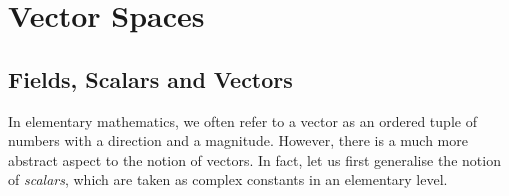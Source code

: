 \documentclass[math, code]{amznotes}
\theoremstyle{remark}
\begin{document}
\tableofcontents

\chapter{Vector Spaces}
\section{Fields, Scalars and Vectors}
In elementary mathematics, we often refer to a vector as an ordered tuple of numbers with a direction and a magnitude. However, there is a much more abstract aspect to the notion of vectors. In fact, let us first generalise the notion of \textit{scalars}, which are taken as complex constants in an elementary level. 
\end{document}
